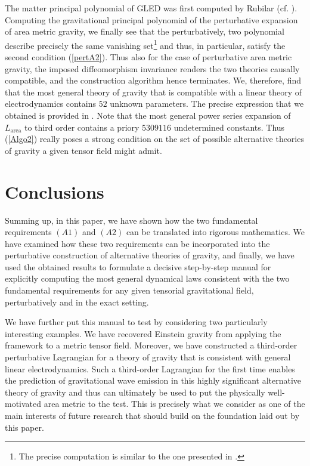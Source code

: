 \documentclass[%
preprint,
nofootinbib,
amsmath,amssymb,
aps,
prd,
floatfix,
]{revtex4-2}
\begin{document}
The matter principal polynomial of GLED was first computed by Rubilar (cf. \cite{2009JPhA...42U5402I}).
Computing the gravitational principal polynomial of the perturbative expansion of area metric gravity, we finally see that the perturbatively, two polynomial describe precisely the same vanishing set\footnote{The precise computation is similar to the one presented in \cite{TobiR}.} and thus, in particular, satisfy the second condition (\ref{pertA2}). 
Thus also for the case of perturbative area metric gravity, the imposed diffeomorphism invariance renders the two theories causally compatible, and the construction algorithm hence terminates. 
We, therefore, find that the most general theory of gravity that is compatible with a linear theory of electrodynamics contains $52$ unknown parameters. The precise expression that we obtained is provided in \cite{TobiMaster}.
Note that the most general power series expansion of $L_{\text{area}}$ to third order contains a priory $5309116$ undetermined constants. Thus (\ref{Algo2}) really poses a strong condition on the set of possible alternative theories of gravity a given tensor field might admit. 
\section{Conclusions}
Summing up, in this paper, we have shown how the two fundamental requirements $(A1)$ and $(A2)$ can be translated into rigorous mathematics. We have examined how these two requirements can be incorporated into the perturbative construction of alternative theories of gravity, and finally, we have used the obtained results to formulate a decisive step-by-step manual for explicitly computing the most general dynamical laws consistent with the two fundamental requirements for any given tensorial gravitational field, perturbatively and in the exact setting.  

We have further put this manual to test by considering two particularly interesting examples. We have recovered Einstein gravity from applying the framework to a metric tensor field. Moreover, we have constructed a third-order perturbative Lagrangian for a theory of gravity that is consistent with general linear electrodynamics. Such a third-order Lagrangian for the first time enables the prediction of gravitational wave emission in this highly significant alternative theory of gravity and thus can ultimately be used to put the physically well-motivated area metric to the test. This is precisely what we consider as one of the main interests of future research that should build on the foundation laid out by this paper.  



\end{document}
